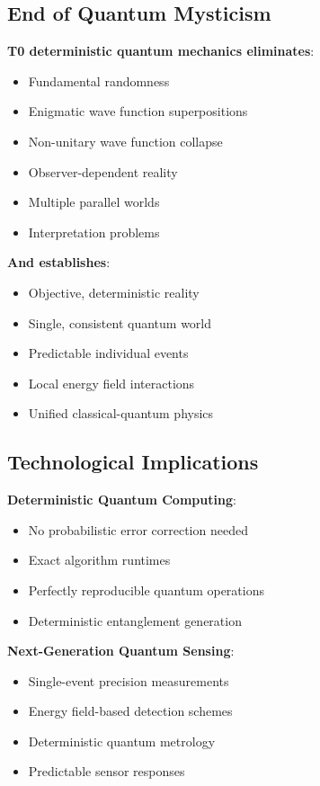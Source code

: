 \documentclass[12pt,a4paper]{article}
\theoremstyle{definition}
\theoremstyle{remark}
\begin{document}
	\subsection{End of Quantum Mysticism}
	
	\begin{tcolorbox}[colback=green!5!white,colframe=green!75!black,title=Deterministic Quantum Reality]
		\textbf{T0 deterministic quantum mechanics eliminates}:
		\begin{itemize}
			\item Fundamental randomness
			\item Enigmatic wave function superpositions
			\item Non-unitary wave function collapse
			\item Observer-dependent reality
			\item Multiple parallel worlds
			\item Interpretation problems
		\end{itemize}
		
		\textbf{And establishes}:
		\begin{itemize}
			\item Objective, deterministic reality
			\item Single, consistent quantum world
			\item Predictable individual events
			\item Local energy field interactions
			\item Unified classical-quantum physics
		\end{itemize}
	\end{tcolorbox}
	
	\subsection{Technological Implications}
	
	\textbf{Deterministic Quantum Computing}:
	\begin{itemize}
		\item No probabilistic error correction needed
		\item Exact algorithm runtimes
		\item Perfectly reproducible quantum operations
		\item Deterministic entanglement generation
	\end{itemize}
	
	\textbf{Next-Generation Quantum Sensing}:
	\begin{itemize}
		\item Single-event precision measurements
		\item Energy field-based detection schemes
		\item Deterministic quantum metrology
		\item Predictable sensor responses
	\end{itemize}
	
\end{document}
